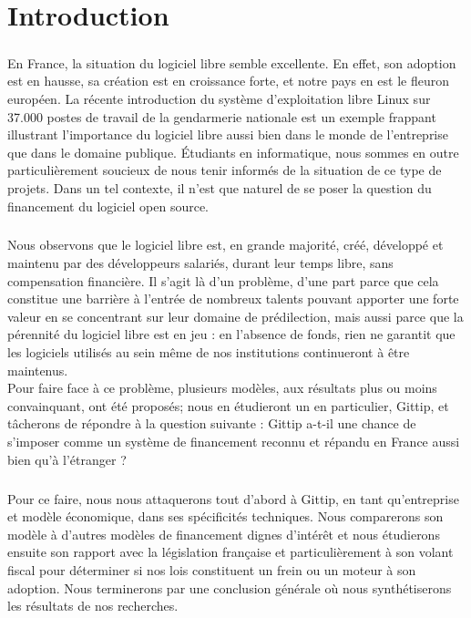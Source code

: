 \chapter*{Introduction}

\paragraph{}
En France, la situation du logiciel libre semble excellente.
En effet, son adoption est en hausse, sa création est en croissance forte,
et notre pays en est le fleuron européen.
La récente introduction du système d'exploitation libre Linux sur 37.000
postes de travail de la gendarmerie nationale est un exemple frappant
illustrant l'importance du logiciel libre aussi bien dans le monde de
l'entreprise que dans le domaine publique.
Étudiants en informatique, nous sommes en outre particulièrement soucieux
de nous tenir informés de la situation de ce type de projets.
Dans un tel contexte, il n'est que naturel de se poser la question du
financement du logiciel open source.

\paragraph{}
Nous observons que le logiciel libre est, en grande majorité, créé,
développé et maintenu par des développeurs salariés, durant leur temps
libre, sans compensation financière. Il s'agit là d'un problème, d'une
part parce que cela constitue une barrière à l'entrée de nombreux talents
pouvant apporter une forte valeur en se concentrant sur leur domaine de
prédilection, mais aussi parce que la pérennité du logiciel libre est en
jeu : en l'absence de fonds, rien ne garantit que les logiciels utilisés
au sein même de nos institutions continueront à être maintenus.\\
Pour faire face à ce problème, plusieurs modèles, aux résultats plus ou
moins convainquant, ont été proposés; nous en étudieront un en
particulier, Gittip, et tâcherons de répondre à la question suivante :
Gittip a-t-il une chance de s'imposer comme un système de financement
reconnu et répandu en France aussi bien qu'à l'étranger ?

\paragraph{}
Pour ce faire, nous nous attaquerons tout d'abord à Gittip, en tant
qu'entreprise et modèle économique, dans ses spécificités techniques.
Nous comparerons son modèle à d'autres modèles de financement
dignes d'intérêt et nous étudierons ensuite son rapport avec la législation
française et particulièrement à son volant fiscal pour déterminer si nos
lois constituent un frein ou un moteur à son adoption.
Nous terminerons par une conclusion générale où nous synthétiserons
les résultats de nos recherches.
